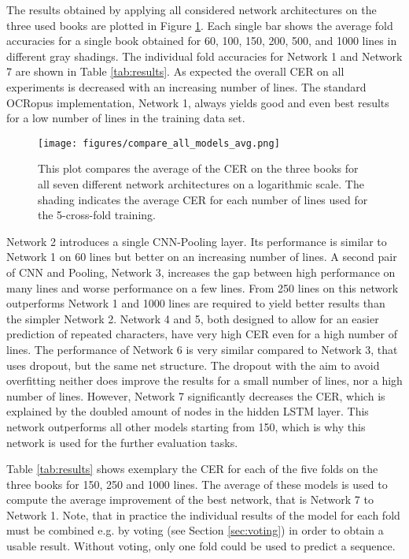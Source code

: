 \documentclass{jlcl}
\begin{document}
The results obtained by applying all considered network architectures on the three used books are plotted in Figure \ref{fig:compare_all_models_avg}.
Each single bar shows the average fold accuracies for a single book obtained for 60, 100, 150, 200, 500, and 1000 lines in different gray shadings.
The individual fold accuracies for Network 1 and Network 7 are shown in Table \ref{tab:results}.
As expected the overall CER on all experiments is decreased with an increasing number of lines.
The standard OCRopus implementation, Network 1, always yields good and even best results for a low number of lines in the training data set.
%
\begin{figure}
    \centering
    \texttt{[image: figures/compare\_all\_models\_avg.png]}
    \caption{This plot compares the average of the CER on the three books for all seven different network architectures on a logarithmic scale. The shading indicates the average CER for each number of lines used for the 5-cross-fold training.}
    \label{fig:compare_all_models_avg}
\end{figure}
%
Network 2 introduces a single CNN-Pooling layer. Its performance is similar to Network 1 on 60 lines but better on an increasing number of lines.
A second pair of CNN and Pooling, Network 3, increases the gap between high performance on many lines and worse performance on a few lines.
From 250 lines on this network outperforms Network 1 and 1000 lines are required to yield better results than the simpler Network 2.
Network 4 and 5, both designed to allow for an easier prediction of repeated characters, have very high CER even for a high number of lines.
The performance of Network 6 is very similar compared to Network 3, that uses dropout, but the same net structure.
The dropout with the aim to avoid overfitting neither does improve the results for a small number of lines, nor a high number of lines.
However, Network 7 significantly decreases the CER, which is explained by the doubled amount of nodes in the hidden LSTM layer.
This network outperforms all other models starting from 150, which is why this network is used for the further evaluation tasks.


Table \ref{tab:results} shows exemplary the CER for each of the five folds on the three books for 150, 250 and 1000 lines.
The average of these models is used to compute the average improvement of the best network, that is Network 7 to Network 1.
Note, that in practice the individual results of the model for each fold must be combined e.g. by voting (see Section \ref{sec:voting}) in order to obtain a usable result.
Without voting, only one fold could be used to predict a sequence.
\end{document}

